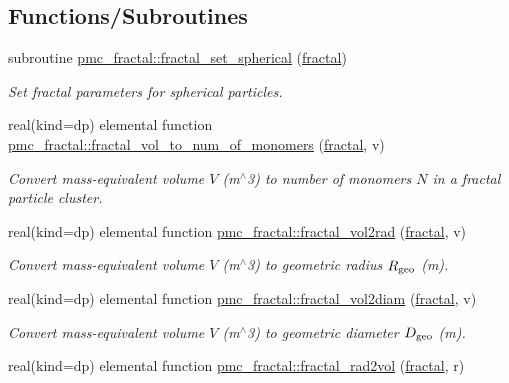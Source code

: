 \subsection*{Functions/\+Subroutines}
\begin{DoxyCompactItemize}
\item 
subroutine \mbox{\hyperlink{namespacepmc__fractal_a6cd53990cfa3426e50dc4c7128a50d6f}{pmc\+\_\+fractal\+::fractal\+\_\+set\+\_\+spherical}} (\mbox{\hyperlink{fractal_8_f90_a949ba7f6f3ce672ed686152acedb28bf}{fractal}})
\begin{DoxyCompactList}\small\item\em Set fractal parameters for spherical particles. \end{DoxyCompactList}\item 
real(kind=dp) elemental function \mbox{\hyperlink{namespacepmc__fractal_a8c77994ce359f18d1a6ada818ac19875}{pmc\+\_\+fractal\+::fractal\+\_\+vol\+\_\+to\+\_\+num\+\_\+of\+\_\+monomers}} (\mbox{\hyperlink{fractal_8_f90_a949ba7f6f3ce672ed686152acedb28bf}{fractal}}, v)
\begin{DoxyCompactList}\small\item\em Convert mass-\/equivalent volume $V$ (m$^\wedge$3) to number of monomers $N$ in a fractal particle cluster. \end{DoxyCompactList}\item 
real(kind=dp) elemental function \mbox{\hyperlink{namespacepmc__fractal_a0bd8a2235975755762809e39c2c8e900}{pmc\+\_\+fractal\+::fractal\+\_\+vol2rad}} (\mbox{\hyperlink{fractal_8_f90_a949ba7f6f3ce672ed686152acedb28bf}{fractal}}, v)
\begin{DoxyCompactList}\small\item\em Convert mass-\/equivalent volume $V$ (m$^\wedge$3) to geometric radius $R_{\rm geo}$ (m). \end{DoxyCompactList}\item 
real(kind=dp) elemental function \mbox{\hyperlink{namespacepmc__fractal_ae2dded7baed16c325ff4b95285e83593}{pmc\+\_\+fractal\+::fractal\+\_\+vol2diam}} (\mbox{\hyperlink{fractal_8_f90_a949ba7f6f3ce672ed686152acedb28bf}{fractal}}, v)
\begin{DoxyCompactList}\small\item\em Convert mass-\/equivalent volume $V$ (m$^\wedge$3) to geometric diameter $D_{\rm geo}$ (m). \end{DoxyCompactList}\item 
real(kind=dp) elemental function \mbox{\hyperlink{namespacepmc__fractal_a79cb00ff9fbed9f45195390589959df5}{pmc\+\_\+fractal\+::fractal\+\_\+rad2vol}} (\mbox{\hyperlink{fractal_8_f90_a949ba7f6f3ce672ed686152acedb28bf}{fractal}}, r)

\end{DoxyCompactItemize}
